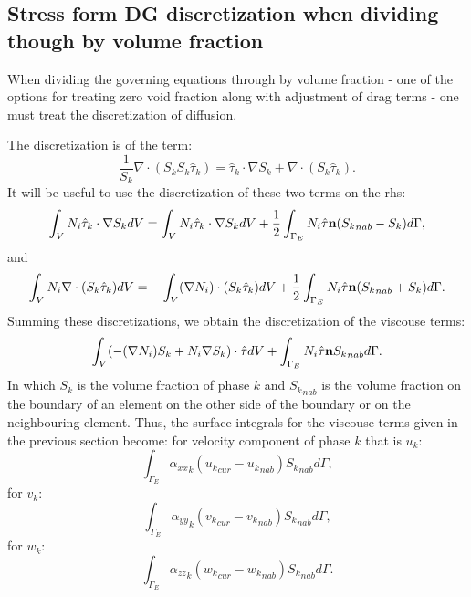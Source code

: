 \subsection{Stress form DG discretization when dividing though by volume fraction}
When dividing the governing equations through by volume fraction - one of
the options for treating zero void fraction along with adjustment of drag terms -
one must treat the discretization of diffusion.

The discretization is of the term:
 \begin{equation}
\frac{1}{S_k} \nabla \cdot (S_k S_k \hat\tau_k ) =
\hat\tau_k \cdot \nabla S_k + \nabla \cdot (S_k \hat\tau_k).
\label{form-derivs-dg-visc}
\end{equation}
It will be useful to use the discretization of these two terms on the rhs:
 \begin{equation}
\int_V N_i \hat \tau_k \cdot \nabla S_k dV
=\int_V N_i \hat \tau_k \cdot \nabla S_k dV
+\frac{1}{2}\int_{\Gamma_E} N_i \hat\tau {\bf n} ( {S_k}_{nab} - S_k ) d\Gamma,
\end{equation}
and
 \begin{equation}
\int_V N_i \nabla \cdot (S_k \hat \tau_k)  dV
=
- \int_V (\nabla N_i) \cdot (S_k \hat \tau_k)  dV
+\frac{1}{2}\int_{\Gamma_E} N_i \hat\tau {\bf n} ( {S_k}_{nab} + S_k ) d\Gamma.
\end{equation}
Summing these discretizations, we obtain the discretization of the viscouse terms:
 \begin{equation}
\int_V (-(\nabla N_i)S_k + N_i \nabla S_k)\cdot \hat \tau dV
+\int_{\Gamma_E} N_i \hat\tau {\bf n}  {S_k}_{nab}  d\Gamma.
\end{equation}
In which $S_k$ is the volume fraction of phase $k$ and ${S_k}_{nab}$ is the
volume fraction on the boundary of an element on the other side of the boundary or on the
neighbouring element.
Thus, the surface integrals for the viscouse terms given in the previous section
become:
for velocity component of phase $k$ that is $u_k$:
\begin{equation}
\int_{\Gamma_E} {\alpha_{xx}}_k ({u_k}_{cur}-{u_k}_{nab}) {S_k}_{nab} d\Gamma,
\end{equation}
for $v_k$:
\begin{equation}
\int_{\Gamma_E} {\alpha_{yy}}_k ({v_k}_{cur}-{v_k}_{nab}) {S_k}_{nab} d\Gamma,
\end{equation}
for $w_k$:
\begin{equation}
\int_{\Gamma_E} {\alpha_{zz}}_k ({w_k}_{cur}-{w_k}_{nab}) {S_k}_{nab} d\Gamma.
\end{equation}




